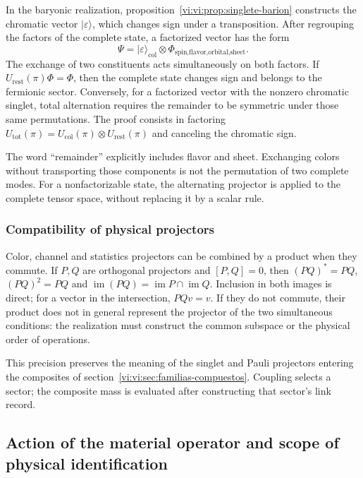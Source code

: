 In the baryonic realization,
proposition~\ref{vi:vi:prop:singlete-barion} constructs the chromatic
vector \(|\varepsilon\rangle\), which changes sign
under a transposition. After regrouping the factors of the complete
state, a factorized vector has the form
\[
 \Psi=|\varepsilon\rangle_{\mathrm{col}}
 \otimes\Phi_{\text{spin,flavor,orbital,sheet}}.
\]
The exchange of two constituents acts simultaneously
on both factors. If \(U_{\mathrm{rest}}(\pi)\Phi=\Phi\),
then the complete state changes sign and belongs to the
fermionic sector. Conversely, for a factorized vector
with the nonzero chromatic singlet, total alternation requires
the remainder to be symmetric under those same permutations.
The proof consists in factoring
\(U_{\mathrm{tot}}(\pi)=U_{\mathrm{col}}(\pi)\otimes
U_{\mathrm{rest}}(\pi)\) and canceling the chromatic sign.

The word “remainder” explicitly includes flavor and sheet.
Exchanging colors without transporting those components is not
the permutation of two complete modes. For a nonfactorizable
state, the alternating projector is applied to the complete tensor
space, without replacing it by a scalar rule.

\subsubsection{Compatibility of physical projectors}

Color, channel and statistics projectors can be combined
by a product when they commute. If \(P,Q\) are orthogonal
projectors and \([P,Q]=0\), then
\((PQ)^*=PQ\), \((PQ)^2=PQ\) and
\(\operatorname{im}(PQ)=\operatorname{im}P\cap\operatorname{im}Q\).
Inclusion in both images is direct; for a vector
in the intersection, \(PQv=v\). If they do not commute, their product
does not in general represent the projector of the two simultaneous
conditions: the realization must construct the common
subspace or the physical order of operations.

This precision preserves the meaning of the singlet
and Pauli projectors entering the composites of
section~\ref{vi:vi:sec:familias-compuestos}. Coupling
selects a sector; the composite mass is evaluated after
constructing that sector's link record.

\subsection{Action of the material operator and scope of physical identification}
\label{vi:vi:subsec:fock-alcance}

